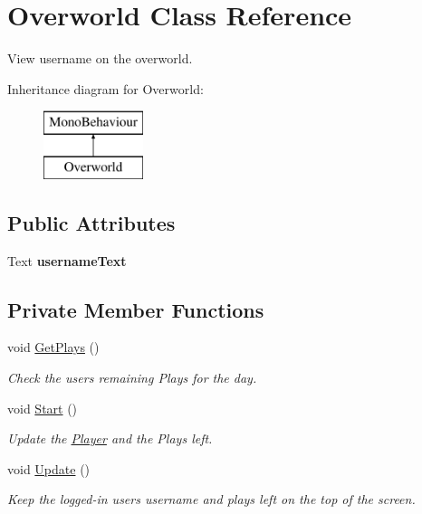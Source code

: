 \hypertarget{class_overworld}{}\section{Overworld Class Reference}
\label{class_overworld}


View username on the overworld.  


Inheritance diagram for Overworld\+:\begin{figure}[H]
\begin{center}
\leavevmode
\includegraphics[height=2.000000cm]{class_overworld}
\end{center}
\end{figure}
\subsection*{Public Attributes}
\begin{DoxyCompactItemize}
\item 
\mbox{\label{class_overworld_ad316e6335a332e6bedcc7bd77b39bd93}} 
Text {\bfseries username\+Text}
\end{DoxyCompactItemize}
\subsection*{Private Member Functions}
\begin{DoxyCompactItemize}
\item 
\mbox{\label{class_overworld_acf1ba6443e23dc40621133acda06ff37}} 
void \mbox{\hyperlink{class_overworld_acf1ba6443e23dc40621133acda06ff37}{Get\+Plays}} ()
\begin{DoxyCompactList}\small\item\em Check the user\textquotesingle{}s remaining Plays for the day. \end{DoxyCompactList}\item 
\mbox{\label{class_overworld_a1065dc87edcf287032a56809584feeab}} 
void \mbox{\hyperlink{class_overworld_a1065dc87edcf287032a56809584feeab}{Start}} ()
\begin{DoxyCompactList}\small\item\em Update the \mbox{\hyperlink{class_player}{Player}} and the Plays left. \end{DoxyCompactList}\item 
\mbox{\label{class_overworld_ad5db914c45c35f2c23d3f03cec2117f9}} 
void \mbox{\hyperlink{class_overworld_ad5db914c45c35f2c23d3f03cec2117f9}{Update}} ()
\begin{DoxyCompactList}\small\item\em Keep the logged-\/in user\textquotesingle{}s username and plays left on the top of the screen. \end{DoxyCompactList}\end{DoxyCompactItemize}
